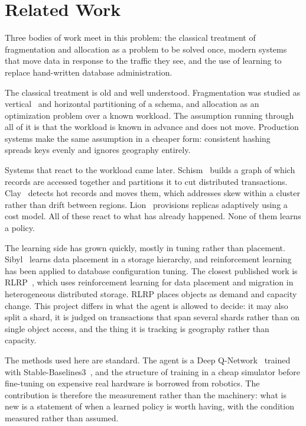 \section{Related Work}

Three bodies of work meet in this problem: the classical treatment of
fragmentation and allocation as a problem to be solved once, modern systems
that move data in response to the traffic they see, and the use of learning
to replace hand-written database administration.

The classical treatment is old and well understood. Fragmentation was studied
as vertical~\cite{navathe1984vertical} and horizontal partitioning of a
schema, and allocation as an optimization problem over a known workload. The
assumption running through all of it is that the workload is known in advance
and does not move. Production systems make the same assumption in a cheaper
form: consistent hashing~\cite{karger1997consistent} spreads keys evenly and
ignores geography entirely.

Systems that react to the workload came later. Schism~\cite{curino2010schism}
builds a graph of which records are accessed together and partitions it to cut
distributed transactions. Clay~\cite{serafini2016clay} detects hot records and
moves them, which addresses skew within a cluster rather than drift between
regions. Lion~\cite{lion2024} provisions replicas adaptively using a cost
model. All of these react to what has already happened. None of them learns a
policy.

The learning side has grown quickly, mostly in tuning rather than placement.
Sibyl~\cite{singh2022sibyl} learns data placement in a storage hierarchy, and
reinforcement learning has been applied to database configuration tuning. The
closest published work is RLRP~\cite{lu2022rlrp}, which uses
reinforcement learning for data placement and migration in heterogeneous
distributed storage. RLRP places objects as demand and capacity change. This
project differs in what the agent is allowed to decide: it may also split a
shard, it is judged on transactions that span several shards rather than on
single object access, and the thing it is tracking is geography rather than
capacity.

The methods used here are standard. The agent is a Deep
Q-Network~\cite{mnih2015dqn} trained with
Stable-Baselines3~\cite{raffin2021sb3}, and the structure of training in a
cheap simulator before fine-tuning on expensive real hardware is borrowed from
robotics. The contribution is therefore the measurement rather than the
machinery: what is new is a statement of when a learned policy is worth
having, with the condition measured rather than assumed.
